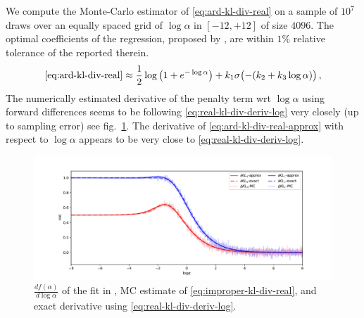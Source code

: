 \documentclass[a4paper,10pt]{article}
\begin{document}
We compute the Monte-Carlo estimator of \eqref{eq:ard-kl-div-real} on a sample of $10^7$
draws over an equally spaced grid of $\log \alpha$ in $[-12, +12]$ of size $4096$. The optimal
coefficients of the regression, proposed by \citep{molchanov_variational_2017}, are within
$1\%$ relative tolerance of the reported therein.
\begin{equation}  \label{eq:ard-kl-div-real-approx}
  \eqref{eq:ard-kl-div-real}
  \approx
    \frac12 \log{\bigl(1 + e^{-\log \alpha}\bigr)}
    + k_1 \sigma\bigl(- (k_2 + k_3 \log \alpha)\bigr)
  \,,
\end{equation}
The numerically estimated derivative of the penalty term wrt $\log \alpha$ using forward
differences seems to be following \eqref{eq:real-kl-div-deriv-log} very closely (up to
sampling error) see fig.~\ref{fig:molchanov-derivative-replica}. The derivative of
\eqref{eq:ard-kl-div-real-approx} with respect to $\log \alpha$ appears to be very close
to \eqref{eq:real-kl-div-deriv-log}.

\begin{figure}[!ht]
  \centering
  \includegraphics[width=1.\linewidth]{../notebooks/assets/grad_log.pdf}
  \caption{$\tfrac{d f(\alpha)}{d \log{\alpha}}$ of the fit in \citep{molchanov_variational_2017},
  MC estimate of \eqref{eq:improper-kl-div-real}, and exact derivative using
  \eqref{eq:real-kl-div-deriv-log}.}
  \label{fig:molchanov-derivative-replica}
\end{figure}
\end{document}
